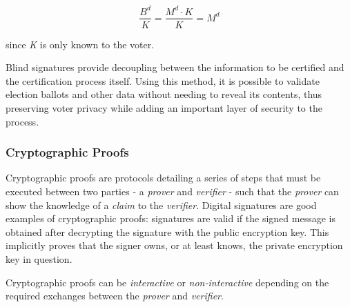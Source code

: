 \documentclass[../access.tex]{subfiles}
\begin{document}
\begin{enumerate}
                    \begin{equation}
                       \frac{B^{d}}{K} = \frac{M^{d} \cdot K}{K} = M^{d} 
                    \end{equation}
                
                since \textit{K} is only known to the voter.
            \end{enumerate}
        
            Blind signatures provide decoupling between the information to be certified and the certification process itself. Using this method, it is possible to validate election ballots and other data without needing to reveal its contents, thus preserving voter privacy while adding an important layer of security to the process.
        
        \subsubsection{Cryptographic Proofs}
            Cryptographic proofs are protocols detailing a series of steps that must be executed between two parties - a \textit{prover} and \textit{verifier} - such that the \textit{prover} can show the knowledge of a \textit{claim} to the \textit{verifier}.
            Digital signatures are good examples of cryptographic proofs: signatures are valid if the signed message is obtained after decrypting the signature with the public encryption key. This implicitly proves that the signer owns, or at least knows, the private encryption key in question.
            \par
            Cryptographic proofs can be \textit{interactive} or \textit{non-interactive} depending on the required exchanges between the \textit{prover} and \textit{verifier}.
\end{document}
